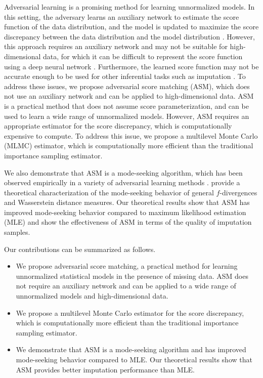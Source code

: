 Adversarial learning is a promising method for learning unnormalized models. In this setting, the adversary learns an auxiliary network to estimate the score function of the data distribution, and the model is updated to maximize the score discrepancy between the data distribution and the model distribution \citep{Huszar2017}. However, this approach requires an auxiliary network and may not be suitable for high-dimensional data, for which it can be difficult to represent the score function using a deep neural network \citep{Wang2016, Grathwohl2020}. Furthermore, the learned score function may not be accurate enough to be used for other inferential tasks such as imputation \citep{Uehara2020}. To address these issues, we propose adversarial score matching (ASM), which does not use an auxiliary network and can be applied to high-dimensional data. ASM is a practical method that does not assume score parameterization, and can be used to learn a wide range of unnormalized models. However, ASM requires an appropriate estimator for the score discrepancy, which is computationally expensive to compute. To address this issue, we propose a multilevel Monte Carlo (MLMC) estimator, which is computationally more efficient than the traditional importance sampling estimator.

We also demonstrate that ASM is a mode-seeking algorithm, which has been observed empirically in a variety of adversarial learning methods \citep{Burda2016, Huszar2017, Sasaki2014}. \citet{TingLi2023} provide a theoretical characterization of the mode-seeking behavior of general $f$-divergences and Wasserstein distance measures. Our theoretical results show that ASM has improved mode-seeking behavior compared to maximum likelihood estimation (MLE) and show the effectiveness of ASM in terms of the quality of imputation samples.

Our contributions can be summarized as follows.
\begin{itemize}
	\item We propose adversarial score matching, a practical method for learning unnormalized statistical models in the presence of missing data. ASM does not require an auxiliary network and can be applied to a wide range of unnormalized models and high-dimensional data.
	\item We propose a multilevel Monte Carlo estimator for the score discrepancy, which is computationally more efficient than the traditional importance sampling estimator.
 \item We demonstrate that ASM is a mode-seeking algorithm and has improved mode-seeking behavior compared to MLE. Our theoretical results show that ASM provides better imputation performance than MLE.
\end{itemize}

